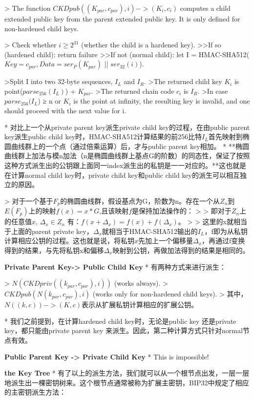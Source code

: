 > The function $CKDpub((K_{par}, c_{par}), i) -> (K_i, c_i)$ computes a child extended public key from the parent extended public key. It is only defined for non-hardened child keys.

> Check whether $i ≥ 2^{31}$ (whether the child is a hardened key).
>>If so (hardened child): return failure  
>>If not (normal child): let I = HMAC-SHA512($Key = c_{par}, Data = ser_P(K_{par})$ || $ser_{32}(i)$).

>Split I into two 32-byte sequences, $I_L$ and $I_R$.  
>The returned child key $K_i$ is point($parse_{256}(I_L)$) + $K_{par}$.  
>The returned chain code $c_i$ is $I_R$.  
>In case $parse_{256}(I_L$) ≥ n or $K_i$ is the point at infinity, the resulting key is invalid, and one should proceed with the next value for i.

* 对比上一个从private parent key派生private child key的过程，在由public parent key派生public child key时，HMAC-SHA512计算结果的前256比特$I_L$首先映射到椭圆曲线群上的一个点（通过倍乘运算）后，才与public parent key相加。
* **椭圆曲线群上加法与模n加法（n是椭圆曲线群上基点G的阶数）的同态性，保证了按照这种方式派生出的公钥跟上面同一index派生出的私钥是一一对应的。**这也就是在计算normal child key时，private child key和public child key的派生可以相互独立的原因。

> 对于一个基于$F_p$的椭圆曲线群，假设基点为G，阶数为n。存在一个从$Z_n$到$E(F_p)$上的映射$f(x)=x*G$,且该映射$f$是保持加法操作的：
> > 即对于$Z_n$上的任意值$x$, $\Delta_x \in Z_n$ 有：$f(x+\Delta_x)=f(x)+f(\Delta_x)$。   
> 
> 这里的x就相当于上面的parent private key，$\Delta_x$就相当于HMAC-SHA512输出的$I_L$，f即为从私钥计算相应公钥的过程。这也就是说，将私钥$x$先加上一个偏移量$\Delta_x$，再通过f变换得到的结果，与先将私钥x和偏移$\Delta_x$映射到公钥，再做加法得到的结果是相同的。

\textbf{Private Parent Key-> Public Child Key}
* 有两种方式来进行派生：

> $N(CKDpriv((k_{par}, c_{par}), i))$ (works always).  
> $CKDpub(N(k_{par}, c_{par}), i)$ (works only for non-hardened child keys).  
> 其中，$N((k, c)) -> (K, c)$表示从扩展私钥计算相应的扩展公钥。

* 我们之前提到，在计算hardened child key时，无论是public key 还是private key，都只能由private parent key 来派生。因此，第二种计算方式只针对normal节点有效。

\textbf{Public Parent Key -> Private Child Key}
* This is impossible!

\textbf{the Key Tree}
* 有了以上的派生方法，我们就可以从一个根节点出发，一层一层地派生出一棵密钥树来。这个根节点通常被称为扩展主密钥，BIP32中规定了相应的主密钥派生方法：


